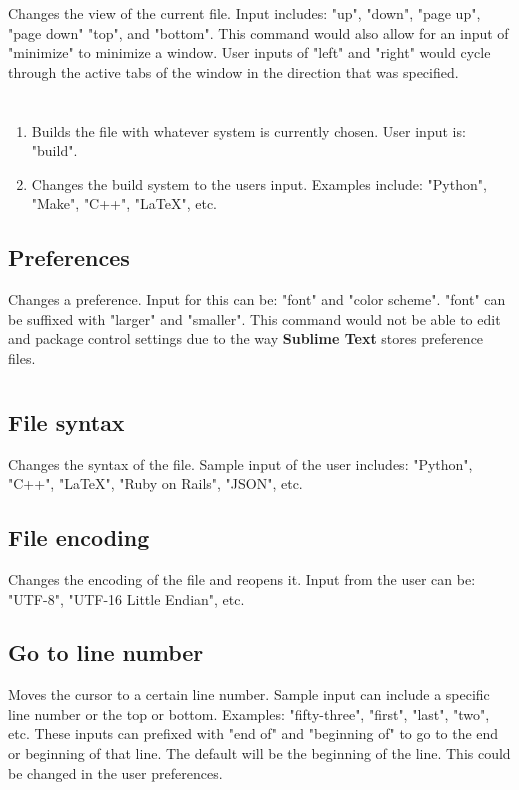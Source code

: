 \documentclass[11pt, oneside]{article}
\begin{document}
	Changes the view of the current file. Input includes: "up", "down", "page up", "page down" "top", and "bottom". This command would also allow for an input of "minimize" to minimize a window. User inputs of "left" and "right" would cycle through the active tabs of the window in the direction that was specified.

\section{}

	\begin{enumerate}
	\item {}
	Builds the file with whatever system is currently chosen. User input is: "build".

	\item {}
	Changes the build system to the users input. Examples include: "Python", "Make", "C++", "\LaTeX", etc.
	\end{enumerate}

\subsection{Preferences}
	Changes a preference. Input for this can be: "font" and  "color scheme". "font" can be suffixed with "larger" and "smaller". This command would not be able to edit and package control settings due to the way \textbf{Sublime Text} stores preference files. 

\section{}

	\subsection{File syntax}
	Changes the syntax of the file. Sample input of the user includes: "Python", "C++", "\LaTeX", "Ruby on Rails", "JSON", etc.

	\subsection{File encoding}
	Changes the encoding of the file and reopens it. Input from the user can be: "UTF-8", "UTF-16 Little Endian", etc.

	\subsection{Go to line number}
	Moves the cursor to a certain line number. Sample input can include a specific line number or the top or bottom. Examples: "fifty-three", "first", "last", "two", etc. These inputs can prefixed with "end of" and "beginning of" to go to the end or beginning of that line. The default will be the beginning of the line. This could be changed in the user preferences.
\end{document}
